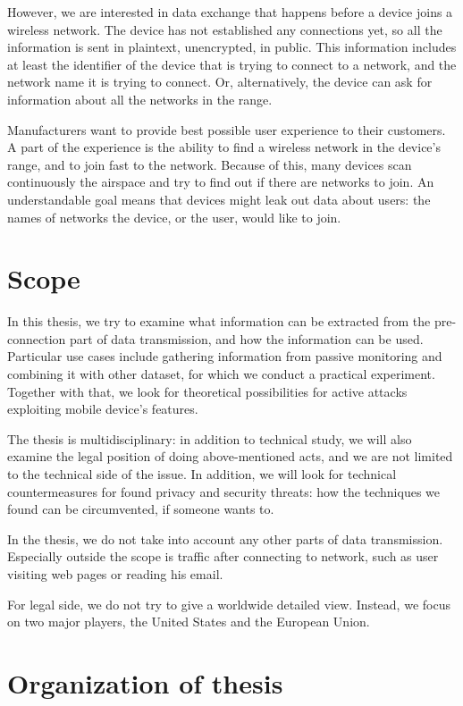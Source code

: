 \documentclass[12pt,a4paper,oneside,pdftex]{report}
\begin{document}
However, we are interested in data exchange that happens before a device joins a wireless network. The device has not established any connections yet, so all the information is sent in plaintext, unencrypted, in public. This information includes at least the identifier of the device that is trying to connect to a network, and the network name it is trying to connect. Or, alternatively, the device can ask for information about all the networks in the range.

Manufacturers want to provide best possible user experience to their customers. A part of the experience is the ability to find a wireless network in the device's range, and to join fast to the network. Because of this, many devices scan continuously the airspace and try to find out if there are networks to join. An understandable goal means that devices might leak out data about users: the names of networks the device, or the user, would like to join.


\section{Scope}
\label{sec:scope}

In this thesis, we try to examine what information can be extracted from the pre-connection part of data transmission, and how the information can be used. Particular use cases include gathering information from passive monitoring and combining it with other dataset, for which we conduct a practical experiment. Together with that, we look for theoretical possibilities for active attacks exploiting mobile device's features.

The thesis is multidisciplinary: in addition to technical study, we will also examine the legal position of doing above-mentioned acts, and we are not limited to the technical side of the issue. In addition, we will look for technical countermeasures for found privacy and security threats: how the techniques we found can be circumvented, if someone wants to.

In the thesis, we do not take into account any other parts of data transmission. Especially outside the scope is traffic after connecting to network, such as user visiting web pages or reading his email.

For legal side, we do not try to give a worldwide detailed view. Instead, we focus on two major players, the United States and the European Union.

\section{Organization of thesis}
\end{document}
